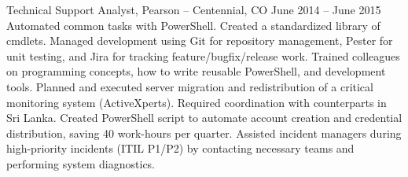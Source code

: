 Technical Support Analyst, Pearson – Centennial, CO
June 2014 – June 2015
Automated common tasks with PowerShell. Created a standardized library of cmdlets. Managed development using Git for repository management, Pester for unit testing, and Jira for tracking feature/bugfix/release work.
Trained colleagues on programming concepts, how to write reusable PowerShell, and development tools.
Planned and executed server migration and redistribution of a critical monitoring system (ActiveXperts). Required coordination with counterparts in Sri Lanka.
Created PowerShell script to automate account creation and credential distribution, saving 40 work-hours per quarter.
Assisted incident managers during high-priority incidents (ITIL P1/P2) by contacting necessary teams and performing system diagnostics.